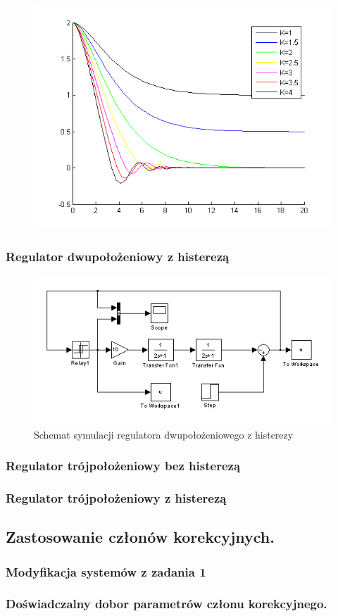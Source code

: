 \documentclass[a4paper,10pt]{article}
\begin{document}
\begin{figure}[!h]
    \centering
	\includegraphics[width=120mm]{CW3-wykres-2bez.png}
	\caption{}
    \label{fig:Rysunek}
\end{figure}

\subsubsection{Regulator dwupołożeniowy z histerezą}\label{sec:r2h}
\begin{figure}[h]
    \centering
	\includegraphics[width=120mm]{CW3-schemat-2z.png}
	\caption{Schemat symulacji regulatora dwupołożeniowego z histerezy}
    \label{fig:Rysunek}
\end{figure}

\subsubsection{Regulator trójpołożeniowy bez histerezą}\label{sec:r3bh}

\subsubsection{Regulator trójpołożeniowy z histerezą}\label{sec:r3h}
\subsection{Zastosowanie członów korekcyjnych.}\label{sec:zad2}
\subsubsection{Modyfikacja systemów z zadania 1}\label{sec:zad2_1}
\subsubsection{Doświadczalny dobor parametrów członu korekcyjnego.}\label{sec:zad2_2}
\end{document}
